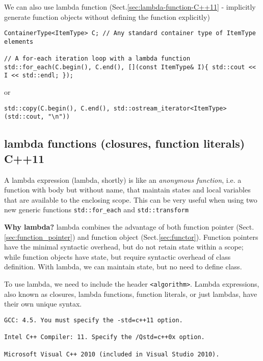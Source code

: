 We can also use lambda function (Sect.\ref{sec:lambda-function-C++11} -
implicitly generate function objects without defining the function explicitly)
\begin{lstlisting}
ContainerType<ItemType> C; // Any standard container type of ItemType elements
 
// A for-each iteration loop with a lambda function
std::for_each(C.begin(), C.end(), [](const ItemType& I){ std::cout << I << std::endl; });
\end{lstlisting}

or
\begin{lstlisting}
std::copy(C.begin(), C.end(), std::ostream_iterator<ItemType>(std::cout, "\n"))
\end{lstlisting}



\subsection{lambda functions (closures, function literals) C++11}
\label{sec:C++11_lambda}
\label{sec:lambda-function-C++11}


A lambda expression (lambda, shortly) is like an {\it anonymous function}, i.e.
a function with body but without name, that maintain states and local variables
that are available to the enclosing scope. This can be very useful when using
two new generic functions \verb!std::for_each! and \verb!std::transform!

{\bf Why lambda?} lambda combines the advantage of both function pointer
(Sect.\ref{sec:function_pointer}) and function object (Sect.\ref{sec:functor}).
Function pointers have the minimal syntactic overhead, but do not retain state
within a scope; while function objects have state, but require syntactic
overhead of class definition. With lambda, we can maintain state, but no need to
define class.

To use lambda, we need to include the header \verb!<algorithm>!.
Lambda expressions, also known as closures, lambda functions, function literals,
or just lambdas, have their own unique syntax.

\begin{verbatim}
GCC: 4.5. You must specify the -std=c++11 option.

Intel C++ Compiler: 11. Specify the /Qstd=c++0x option.

Microsoft Visual C++ 2010 (included in Visual Studio 2010).
\end{verbatim}

